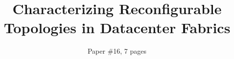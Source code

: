 \documentclass{hotnets15}
\begin{document}
\title{Characterizing Reconfigurable Topologies in Datacenter Fabrics}

\author{\alignauthor Paper \#16, 7 pages}


\maketitle










\newpage\phantom{t}


\end{document}
